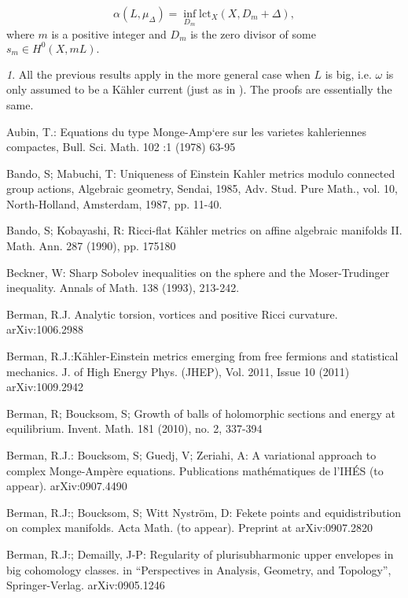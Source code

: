 \documentclass[11pt,oneside,english]{amsart}
\numberwithin{equation}{section}
\numberwithin{figure}{section}
\theoremstyle{plain}
\theoremstyle{plain}
\theoremstyle{plain}
\theoremstyle{plain}
\theoremstyle{remark}
\newtheorem{rem}[thm]{\protect\remarkname}
\theoremstyle{definition}
\providecommand{\remarkname}{Remark}
\begin{document}
\[
\alpha(L,\mu_{\Delta})=\inf_{D_{m}}\mbox{lct}_{X}(X,D_{m}+\Delta),
\]
 where $m$ is a positive integer and $D_{m}$ is the zero divisor
of some $s_{m}\in H^{0}(X,mL).$ 
\begin{rem}
All the previous results apply in the more general case when $L$
is big, i.e. $\omega$ is only assumed to be a Kähler current (just
as in \cite{dem2}). The proofs are essentially the same.\end{rem}
\begin{thebibliography}{10}
Aubin, T.: Equations du type Monge-Amp`ere sur les vari\textasciiacute{}et\textasciiacute{}es
k\textasciidieresis{}ahl\textasciiacute{}eriennes compactes, Bull.
Sci. Math. 102 :1 (1978) 63-95

Bando, S; Mabuchi, T: Uniqueness of Einstein Kahler
metrics modulo connected group actions, Algebraic geometry, Sendai,
1985, Adv. Stud. Pure Math., vol. 10, North-Holland, Amsterdam, 1987,
pp. 11-40.

Bando, S; Kobayashi, R: Ricci-flat Kähler metrics on
affine algebraic manifolds II. Math. Ann. 287 (1990), pp. 175\textendash{}180

Beckner, W: Sharp Sobolev inequalities on the sphere
and the Moser-Trudinger inequality. Annals of Math. 138 (1993), 213-242.

Berman, R.J. Analytic torsion, vortices and positive
Ricci curvature. arXiv:1006.2988

Berman, R.J.:Kähler-Einstein metrics emerging from free
fermions and statistical mechanics. J. of High Energy Phys. (JHEP),
Vol. 2011, Issue 10 (2011) arXiv:1009.2942

Berman, R; Boucksom, S; Growth of balls of holomorphic
sections and energy at equilibrium. Invent. Math. 181 (2010), no.
2, 337-394

Berman, R.J.: Boucksom, S; Guedj, V; Zeriahi, A: A
variational approach to complex Monge-Ampère equations. Publications
mathématiques de l'IHÉS (to appear). arXiv:0907.4490

Berman, R.J:; Boucksom, S; Witt Nyström, D: Fekete
points and equidistribution on complex manifolds. Acta Math. (to appear).
Preprint at arXiv:0907.2820

Berman, R.J:; Demailly, J-P: Regularity of plurisubharmonic
upper envelopes in big cohomology classes. in ``Perspectives in Analysis,
Geometry, and Topology'',\emph{ }Springer-Verlag. arXiv:0905.1246


\end{thebibliography}
\end{document}

